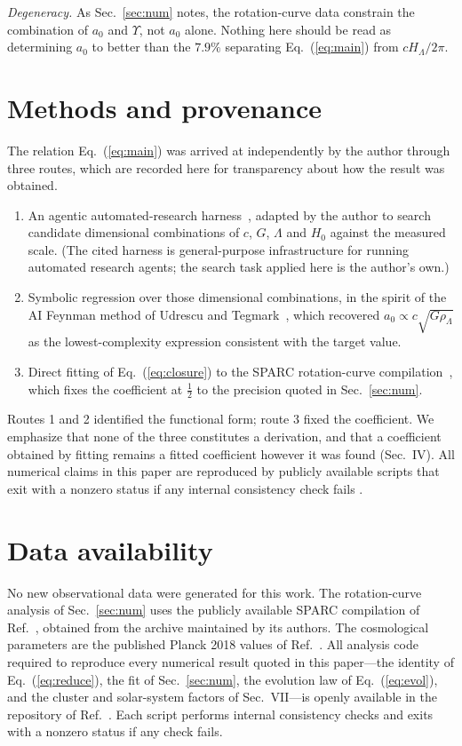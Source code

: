 \documentclass[aps,prd,reprint,amsmath,amssymb,nofootinbib,superscriptaddress]{revtex4-2}
\begin{document}
\emph{Degeneracy.} As Sec.~\ref{sec:num} notes, the rotation-curve data constrain the combination of
$a_0$ and $\Upsilon$, not $a_0$ alone. Nothing here should be read as determining $a_0$ to better than
the $7.9\%$ separating Eq.~(\ref{eq:main}) from $cH_\Lambda/2\pi$.

\section{Methods and provenance}

The relation Eq.~(\ref{eq:main}) was arrived at independently by the author through three routes, which
are recorded here for transparency about how the result was obtained.

\begin{enumerate}
\item An agentic automated-research harness~\cite{AutoresearchTool}, adapted by the author to
      search candidate dimensional combinations of $c$, $G$, $\Lambda$ and $H_0$ against the measured
      scale. (The cited harness is general-purpose infrastructure for running automated research agents;
      the search task applied here is the author's own.)
\item Symbolic regression over those dimensional combinations, in the spirit of the AI Feynman
      method of Udrescu and Tegmark~\cite{AIFeynman}, which recovered
      $a_0 \propto c\sqrt{G\rho_\Lambda}$ as the lowest-complexity expression consistent with the
      target value.
\item Direct fitting of Eq.~(\ref{eq:closure}) to the SPARC rotation-curve
      compilation~\cite{SPARC}, which fixes the coefficient at $\tfrac12$ to the precision quoted in
      Sec.~\ref{sec:num}.
\end{enumerate}

Routes 1 and 2 identified the functional form; route 3 fixed the coefficient. We emphasize that none of
the three constitutes a derivation, and that a coefficient obtained by fitting remains a fitted
coefficient however it was found (Sec.~IV). All numerical claims in this paper are reproduced by
publicly available scripts that exit with a nonzero status if any internal consistency check fails
\cite{Repo}.

\section*{Data availability}

No new observational data were generated for this work. The rotation-curve analysis of
Sec.~\ref{sec:num} uses the publicly available SPARC compilation of Ref.~\cite{SPARC}, obtained from
the archive maintained by its authors. The cosmological parameters are the published Planck 2018
values of Ref.~\cite{Planck2018}. All analysis code required to reproduce every numerical result
quoted in this paper---the identity of Eq.~(\ref{eq:reduce}), the fit of Sec.~\ref{sec:num}, the
evolution law of Eq.~(\ref{eq:evol}), and the cluster and solar-system factors of Sec.~VII---is
openly available in the repository of Ref.~\cite{Repo}. Each script performs internal consistency
checks and exits with a nonzero status if any check fails.
\end{document}
